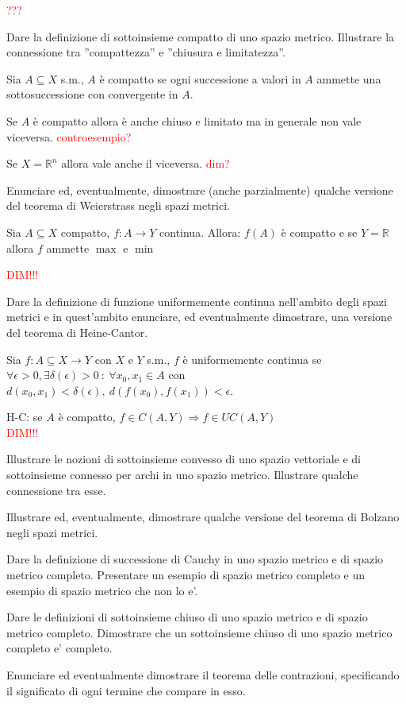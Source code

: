 \documentclass{exam}
\newcommand{\R}[0]{\mathbb{R}}
\newcommand{\err}[1]{\textcolor{red}{#1}}
\begin{document}
\begin{questions}
\begin{solution}
    \err{???}
\end{solution}

\question Dare la definizione di sottoinsieme compatto di uno spazio metrico. Illustrare la connessione tra ”compattezza” e ”chiusura e limitatezza”.
\begin{solution}
    Sia $A\subseteq X$ s.m., $A$ è compatto se ogni successione a valori in $A$ ammette una sottosuccessione con convergente in $A$.

    Se $A$ è compatto allora è anche chiuso e limitato ma in generale non vale viceversa. \err{controesempio?}

    Se $X = \R^n$ allora vale anche il viceversa. \err{dim?}
\end{solution}

\question Enunciare ed, eventualmente, dimostrare (anche parzialmente) qualche versione del teorema di Weierstrass negli spazi metrici.
\begin{solution}
    Sia $A\subseteq X$ compatto, $f: A \to Y$ continua.
    Allora: $f(A)$ è compatto e se $Y=\R$ allora $f$ ammette $\max$ e $\min$

    \err{DIM!!!}
    \end{solution}

\question Dare la definizione di funzione uniformemente continua nell'ambito degli spazi metrici e in quest'ambito enunciare, ed eventualmente dimostrare, una versione del teorema di Heine-Cantor.
\begin{solution}
    Sia $f: A\subseteq X \rightarrow Y$ con $X$ e $Y$ s.m., $f$ è uniformemente continua se $\forall \epsilon>0,  \exists \delta(\epsilon)>0 \ : \ \forall x_0,x_1 \in A$ con $ d(x_0,x_1)<\delta(\epsilon),\ d(f(x_0), f(x_1)) <\epsilon$.

    H-C: se $A$ è compatto, $f\in C(A,Y) \Longrightarrow f \in UC(A,Y)$\\
    \err{DIM!!!}
\end{solution}

\question Illustrare le nozioni di sottoinsieme convesso di uno spazio vettoriale e di sottoinsieme connesso per archi in uno spazio metrico. Illustrare qualche connessione tra esse. 

\question Illustrare ed, eventualmente, dimostrare qualche versione del teorema di Bolzano negli spazi metrici.

\question Dare la definizione di successione di Cauchy in uno spazio metrico e di spazio metrico completo. Presentare un esempio di spazio metrico completo e un esempio di spazio metrico che non lo e’.

\question Dare le definizioni di sottoinsieme chiuso di uno spazio metrico e di spazio metrico completo. Dimostrare che un sottoinsieme chiuso di uno spazio metrico completo e’ completo.

\question Enunciare ed eventualmente dimostrare il teorema delle contrazioni, specificando il significato di ogni termine che compare in esso.
    
\end{questions}
\end{document}
